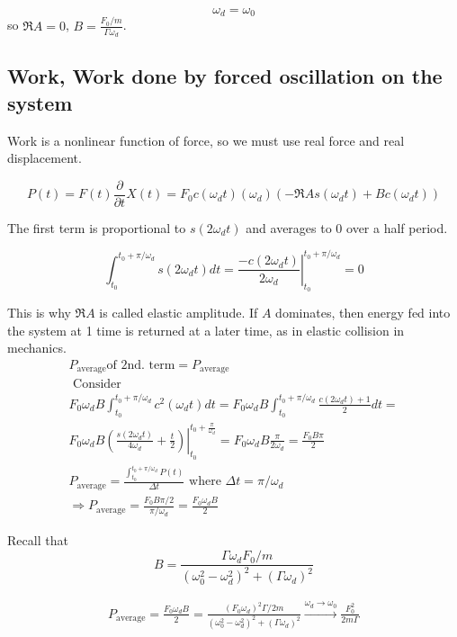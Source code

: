 \documentclass[10pt]{amsart}
\begin{document}
\begin{multicols*}{2}
\[
\omega_d = \omega_0
\]
so $\Re{A} = 0$, $B = \frac{ F_0 / m}{ \Gamma \omega_d}$.

\subsection{Work, Work done by forced oscillation on the system}

Work is a nonlinear function of force, so we must use real force and real displacement.

\[
P(t) = F(t) \frac{\partial }{\partial t} X(t) = F_0 c(\omega_d t) (\omega_d) (-\Re{A} s(\omega_d t) + B c(\omega_d t))
\]

The first term is proportional to $s(2\omega_d t)$ and averages to 0 over a half period.

\[
\int_{t_0}^{t_0 + \pi / \omega_d} s(2\omega_d t) dt = \left. \frac{ -c(2\omega_d t) }{2 \omega_d } \right|_{t_0}^{t_0 + \pi /\omega_d} = 0
\]

This is why $\Re{A}$ is called elastic amplitude. If $A$ dominates, then energy fed into the system at 1 time is returned at a later time, as in elastic collision in mechanics.
\[
\begin{gathered}
	P_{\text{average}} \text{of 2nd. term} = P_{\text{average}} \\
	\text{ Consider } \\
	F_0 \omega_d B \int_{t_0}^{t_0 + \pi/ \omega_d} c^2 (\omega_d t) dt = F_0 \omega_d B \int_{t_0}^{t_0 + \pi/ \omega_d} \frac{ c(2\omega_d t) + 1}{2} dt = \\
	F_0 \omega_d B \left. \left( \frac{ s(2\omega_d t) }{ 4 \omega_d } + \frac{t}{2} \right) \right|_{t_0}^{t_0 + \frac{\pi}{\omega_d} } = F_0 \omega_d B \frac{\pi}{2\omega_d} = \frac{F_0 B\pi}{2} \\
	P_{\text{average}} = \frac{ \int_{t_0}^{t_0 + \pi / \omega_d} P(t) }{ \Delta t}  \text{ where } \Delta t = \pi / \omega_d \\
	\Longrightarrow P_{\text{average}} = \frac{ F_0 B\pi /2}{ \pi / \omega_d}  = \boxed{ \frac{F_0 \omega_d B}{2} }
\end{gathered}
\]

Recall that
\[
B = \frac{ \Gamma \omega_d F_0 /m }{ (\omega_0^2 - \omega_d^2)^2 + (\Gamma \omega_d)^2 }
\]

\[
\begin{gathered}
	P_{\text{average}} = \frac{F_0 \omega_d B}{2} = \frac{ (F_0 \omega_d)^2 \Gamma /2m }{ (\omega_0^2 - \omega_d^2)^2 + (\Gamma \omega_d)^2 } \xrightarrow{ \omega_d\to \omega_0} \frac{F_0^2}{ 2m \Gamma}
\end{gathered}
\]


\end{multicols*}
\end{document}
